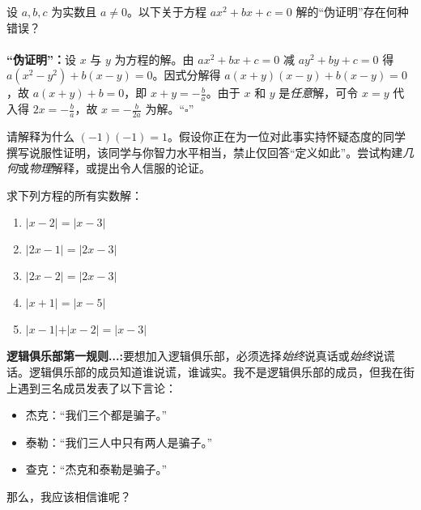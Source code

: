 \clearpage

\begin{exercise}
    设 $a,b,c$ 为实数且 $a \ne 0$。以下关于方程 $ax^2 + bx + c = 0$ 解的``伪证明''存在何种错误？\\
    \\
    \textbf{``伪证明''：}设 $x$ 与 $y$ 为方程的解。由 $ax^2+bx+c = 0$ 减 $ay^2+by+c = 0$ 得 $a(x^2-y^2)+b(x-y) = 0$。因式分解得 $a(x+y)(x-y)+b(x-y) = 0$，故 $a(x+y)+b = 0$，即 $x + y = -\frac{b}{a}$。由于 $x$ 和 $y$ 是\emph{任意}解，可令 $x = y$ 代入得 $2x = -\frac{b}{a}$，故 $x = -\frac{b}{2a}$ 为解。``$\square$''
\end{exercise}

\begin{exercise}
    请解释为什么 $(-1)(-1) = 1$。假设你正在为一位对此事实持怀疑态度的同学撰写说服性证明，该同学与你智力水平相当，禁止仅回答``定义如此''。尝试构建\emph{几何}或\emph{物理}解释，或提出令人信服的论证。
\end{exercise}

\begin{exercise}
    求下列方程的所有实数解：

    \begin{enumerate}
        \item $\vert x-2 \vert = \vert x-3\vert$
        \item $\vert 2x-1 \vert = \vert 2x-3\vert$
        \item $\vert 2x-2 \vert = \vert 2x-3\vert$
        \item $\vert x+1 \vert = \vert x-5\vert$
        \item $\vert x-1 \vert + \vert x-2 \vert = \vert x-3\vert$
    \end{enumerate}
\end{exercise}

\begin{exercise}
    \textbf{逻辑俱乐部第一规则...:}要想加入逻辑俱乐部，必须选择\emph{始终}说真话或\emph{始终}说谎话。逻辑俱乐部的成员知道谁说谎，谁诚实。我不是逻辑俱乐部的成员，但我在街上遇到三名成员发表了以下言论：
    \begin{itemize}
        \item 杰克：``我们三个都是骗子。''
        \item 泰勒：``我们三人中只有两人是骗子。'' 
        \item 查克：``杰克和泰勒是骗子。''
    \end{itemize}
    那么，我应该相信谁呢？
\end{exercise}

